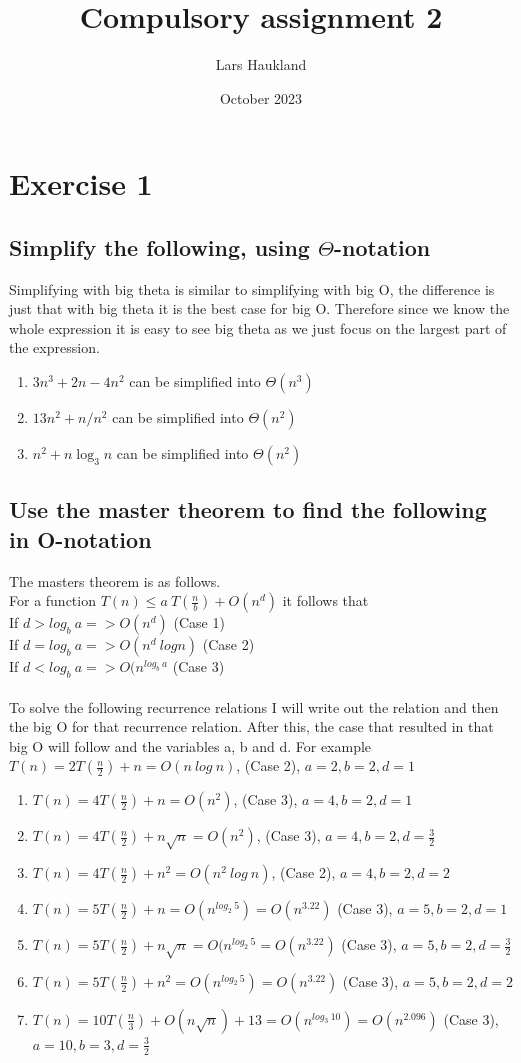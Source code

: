 \documentclass{article}
\title{Compulsory assignment 2}
\author{Lars Haukland }
\date{October 2023}
\begin{document}
\section{Exercise 1}
\subsection{Simplify the following, using $\Theta$-notation}
Simplifying with big theta is similar to simplifying with big O, the difference is just that with big theta it is the best case for big O. Therefore since we know the whole expression it is easy to see big theta as we just focus on the largest part of the expression.
\begin{enumerate}
    \item $3n^3 + 2n - 4n^2$ can be simplified into $\Theta(n^3)$
    \item $13n^2 + n/n^2$ can be simplified into $\Theta(n^2)$
    \item $n^2 + n \log_3n$ can be simplified into $\Theta(n^2)$
\end{enumerate}

\subsection{Use the master theorem to find the following in O-notation}
The masters theorem is as follows.\\
For a function $T(n) \leq a\ T(\frac{n}{b}) + O(n^d)$ it follows that\\
If $d > log_b\ a => O(n^d)$ (Case 1)\\
If $d = log_b\ a => O(n^d\ log n)$ (Case 2)\\
If $d < log_b\ a => O(n^{log_b\ a}$ (Case 3)\\ \\
To solve the following recurrence relations I will write out the relation and then the big O for that recurrence relation. After this, the case that resulted in that big O will follow and the variables a, b and d. For example \\
$T(n) = 2T(\frac{n}{2}) + n = O(n\ log\ n)$, (Case 2), $a = 2, b = 2, d = 1$
\begin{enumerate}
    \item $T(n) = 4T(\frac{n}{2}) + n = O(n^2)$, (Case 3), $a = 4, b = 2, d = 1$
    \item $T(n) = 4T(\frac{n}{2}) + n\sqrt{n} = O(n^2)$, (Case 3), $a = 4, b = 2, d = \frac{3}{2}$
    \item $T(n) = 4T(\frac{n}{2}) + n^2 = O(n^2\ log\ n)$, (Case 2), $a = 4, b = 2, d = 2$
    \item $T(n) = 5T(\frac{n}{2}) + n = O(n^{log_2\ 5}) = O(n^{3.22})$ (Case 3), $a = 5, b = 2, d = 1$
    \item $T(n) = 5T(\frac{n}{2}) + n\sqrt{n} = O(n^{log_2\ 5} = O(n^{3.22})$ (Case 3), $a = 5, b = 2, d = \frac{3}{2}$
    \item $T(n) = 5T(\frac{n}{2}) + n^2 = O(n^{log_2\ 5}) = O(n^{3.22})$ (Case 3), $a = 5, b = 2, d = 2$
    \item $T(n) = 10T(\frac{n}{3}) + O(n\sqrt{n}) + 13 = O(n^{log_3\ 10}) = O(n^{2.096})$ (Case 3), $a = 10, b = 3, d = \frac{3}{2}$
\end{enumerate}
\end{document}
